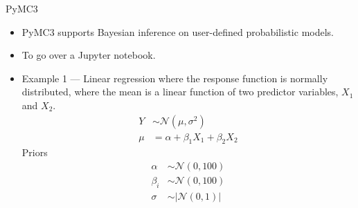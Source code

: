 \documentclass[20pt]{beamer}
\begin{document}
\begin{frame}{PyMC3}
\begin{itemize}

\item PyMC3 supports Bayesian inference on user-defined probabilistic models.

\item To go over a Jupyter notebook.

\item Example 1 --- Linear regression where the response function is normally distributed, where the mean is a linear function of two predictor variables, $X_1$ and $X_2$.
\begin{align*}
  Y  &\sim \mathcal{N}(\mu, \sigma^2) \\
  \mu &= \alpha + \beta_1 X_1 + \beta_2 X_2
\end{align*}
Priors
\begin{align*}
  \alpha &\sim \mathcal{N}(0, 100) \\
  \beta_i &\sim \mathcal{N}(0, 100) \\
  \sigma &\sim \lvert\mathcal{N}(0, 1){\rvert}
\end{align*}

\end{itemize}
\end{frame}
\end{document}
